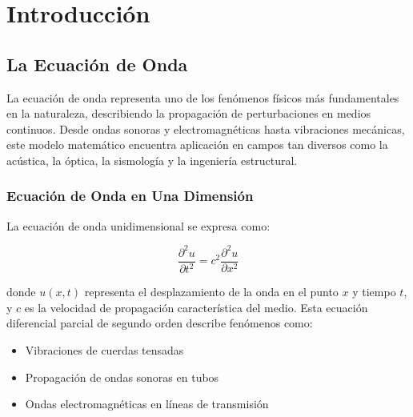 \documentclass[a4paper]{article}
\begin{document}


\maketitle

\tableofcontents
\newpage

\section{Introducción}

\subsection{La Ecuación de Onda}

La ecuación de onda representa uno de los fenómenos físicos más fundamentales en la naturaleza, describiendo la propagación de perturbaciones en medios continuos. Desde ondas sonoras y electromagnéticas hasta vibraciones mecánicas, este modelo matemático encuentra aplicación en campos tan diversos como la acústica, la óptica, la sismología y la ingeniería estructural.

\subsubsection{Ecuación de Onda en Una Dimensión}

La ecuación de onda unidimensional se expresa como:

\begin{equation}
    \frac{\partial^2 u}{\partial t^2} = c^2 \frac{\partial^2 u}{\partial x^2}
\end{equation}

donde $u(x,t)$ representa el desplazamiento de la onda en el punto $x$ y tiempo $t$, y $c$ es la velocidad de propagación característica del medio. Esta ecuación diferencial parcial de segundo orden describe fenómenos como:

\begin{itemize}
    \item Vibraciones de cuerdas tensadas
    \item Propagación de ondas sonoras en tubos
    \item Ondas electromagnéticas en líneas de transmisión
\end{itemize}
\end{document}
